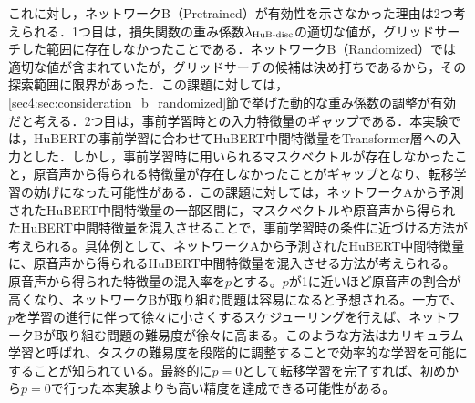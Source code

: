 これに対し，ネットワークB（Pretrained）が有効性を示さなかった理由は2つ考えられる．1つ目は，損失関数の重み係数$\lambda_{\text{HuB-disc}}$の適切な値が，グリッドサーチした範囲に存在しなかったことである．ネットワークB（Randomized）では適切な値が含まれていたが，グリッドサーチの候補は決め打ちであるから，その探索範囲に限界があった．この課題に対しては，\ref{sec4:sec:consideration_b_randomized}節で挙げた動的な重み係数の調整が有効だと考える．2つ目は，事前学習時との入力特徴量のギャップである．本実験では，HuBERTの事前学習に合わせてHuBERT中間特徴量をTransformer層への入力とした．しかし，事前学習時に用いられるマスクベクトルが存在しなかったこと，原音声から得られる特徴量が存在しなかったことがギャップとなり、転移学習の妨げになった可能性がある．この課題に対しては，ネットワークAから予測されたHuBERT中間特徴量の一部区間に，マスクベクトルや原音声から得られたHuBERT中間特徴量を混入させることで，事前学習時の条件に近づける方法が考えられる。具体例として、ネットワークAから予測されたHuBERT中間特徴量に、原音声から得られるHuBERT中間特徴量を混入させる方法が考えられる。原音声から得られた特徴量の混入率を$p$とする。$p$が1に近いほど原音声の割合が高くなり、ネットワークBが取り組む問題は容易になると予想される。一方で、$p$を学習の進行に伴って徐々に小さくするスケジューリングを行えば、ネットワークBが取り組む問題の難易度が徐々に高まる。このような方法はカリキュラム学習と呼ばれ、タスクの難易度を段階的に調整することで効率的な学習を可能にすることが知られている。最終的に$p = 0$として転移学習を完了すれば、初めから$p = 0$で行った本実験よりも高い精度を達成できる可能性がある。

